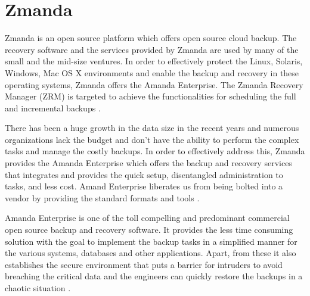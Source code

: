 \section{Zmanda}
Zmanda is an open source platform which offers open source cloud backup. 
The recovery software and the services provided by Zmanda are used by 
many of the small and the mid-size ventures. In order to effectively 
protect the Linux, Solaris, Windows, Mac OS X environments and enable 
the backup and recovery in these operating systems, Zmanda offers 
the Amanda Enterprise. The Zmanda Recovery Manager (ZRM) is targeted to 
achieve the functionalities for scheduling the full 
and incremental backups \cite{hid-sp18-412-zmanda_crunchbase}.

There has been a huge growth in the data size in the recent years and 
numerous organizations lack the budget and don't have the ability to 
perform the complex tasks and manage the
costly backups. In order to effectively address this, Zmanda
provides the Amanda Enterprise which offers the backup and recovery services 
that integrates and provides the quick setup, disentangled administration 
to tasks, and less cost. Amand Enterprise liberates us from being bolted 
into a vendor by providing the standard 
formats and tools \cite{hid-sp18-412-zmanda_amanda}.


Amanda Enterprise is one of the toll compelling and predominant 
commercial open source backup and recovery software. It provides the 
less time consuming solution with the goal to implement the backup tasks 
in a simplified manner for the various systems, databases 
and other applications. Apart, from these it also establishes the 
secure environment that puts a barrier for intruders to avoid 
breaching the critical data and the engineers can quickly restore 
the backups in a chaotic situation \cite{hid-sp18-412-zmanda_webinar}.

